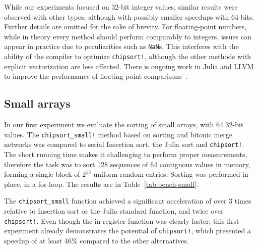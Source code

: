 \documentclass{juliacon}
\begin{document}
While our experiments focused on 32-bit integer values, similar results were observed with other types, although with possibly smaller speedups with 64-bits. Further details are omitted for the sake of brevity. For floating-point numbers, while in theory every method should perform comparably to integers, issues can appear in practice due to peculiarities such as {\tt NaN}s. This interferes with the ability of the compiler to optimize {\tt chipsort!}, although the other methods with explicit vectorization are less affected. There is ongoing work in Julia and LLVM to improve the performance of floating-point comparisons~\cite{llvmD62272,llvm3acc4236b871,Julia31442}.

\subsection{Small arrays}
In our first experiment we evaluate the sorting of small arrays, with 64 32-bit values. The {\tt chipsort\_small!} method based on sorting and bitonic merge networks was compared to serial Insertion sort, the Julia sort and {\tt chipsort!}. The short running time makes it challenging to perform proper measurements, therefore the task was to sort 128 sequences of 64 contiguous values in memory, forming a single block of $2^{13}$ uniform random entries. Sorting was performed in-place, in a for-loop. The results are in Table~\ref{tab:bench-small}.

\begin{table}[h]
\label{tab:bench-small}
\end{table}

The {\tt chipsort\_small} function achieved a significant acceleration of over 3 times relative to Insertion sort or the Julia standard function, and twice over {\tt chipsort!}. Even though the in-register function was clearly faster, this first experiment already demonstrates the potential of {\tt chipsort!}, which presented a speedup of at least 46\% compared to the other alternatives.
\end{document}
